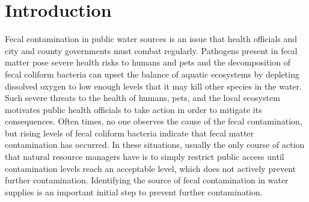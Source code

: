\chapter{Introduction}
Fecal contamination in public water sources is an issue that health officials and city and county governments must combat regularly.
Pathogens present in fecal matter pose severe health risks to humans and pets
and
the decomposition of fecal coliform bacteria can upset the balance of aquatic ecosystems by depleting dissolved oxygen to low enough levels that it may kill other species in the water.
Such severe threats to the health of humans, pets, and the local ecosystem motivates public health officials to take action in order to mitigate its consequences.
Often times, no one observes the cause of the fecal contamination, but rising levels of fecal coliform bacteria indicate that fecal matter contamination has occurred.
In these situations, usually the only course of action that natural resource managers have is to simply restrict public access until contamination levels reach an acceptable level, which does not actively prevent further contamination.
Identifying the source of fecal contamination in water supplies is an important initial step to prevent further contamination.

